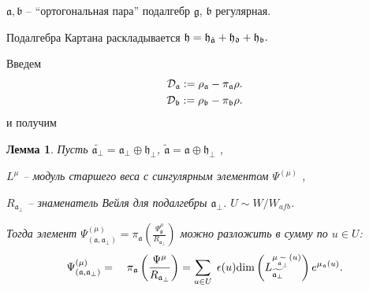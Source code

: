 \documentclass[pdftex]{beamer}
\newtheorem{mylemma}[theorem]{Лемма}
\newcommand{\gf}{\mathfrak{g}}
\newcommand{\af}{\mathfrak{a}}
\newcommand{\afh}{\hat{\mathfrak{a}}}
\newcommand{\bff}{\mathfrak{b}}
\newcommand{\afb}{\mathfrak{a}_{\bot}}
\newcommand{\hf}{\mathfrak{h}}
\theoremstyle{definition} \newtheorem{Def}{Определение}
\begin{document}
\begin{frame}
  
$\af, \mathfrak{b}$ -- ``ортогональная пара'' подалгебр $\gf$, $\bff$ регулярная.

Подалгебра Картана раскладывается
$\frak{{h}=\frak{h}_{\afh}+\frak{h}_{d}+\frak{h}_{\frak{b}}.}$

Введем
\begin{eqnarray*}
\mathcal{D}_{\af} :=\rho_{\af}-\pi_{\af}\rho.\\
\mathcal{D}_{\frak{b}} :=\rho_{\frak{b}}-\pi_{\frak{b}}\rho.
\end{eqnarray*}
и получим
\begin{mylemma}
\label{lemma}
Пусть  $\widetilde{\afb}=\afb\oplus \hf_{\perp }$, $\widetilde{\af}=\af\oplus\hf_{\perp }$ ,

$L^{\mu }$ -- модуль старшего веса с сингулярным элементом $\Psi ^{\left(\mu \right)}$ ,

$R_{\af_{\perp }}$ -- знаменатель Вейля для подалгебры $\af_{\perp }$. $U\sim W/W_{afb}$.

Тогда элемент  $\Psi ^{\left( \mu \right) }_{\left(  \af, \afb \right)}=\pi _{\af}\left( \frac{\Psi _{\gf}^{\mu }}{R_{\af_{\perp }}}\right) $ можно разложить в сумму по  $u\in U$:
\begin{equation*}
\Psi ^{\left( \mu \right) }_{\left(  \af, \afb \right)}=\quad \pi _{\af}\left( \frac{\Psi^{\mu }}{R_{\af%
_{\perp }}}\right) =\sum_{u\in U}\;\epsilon (u)\mathrm{\dim }
\left( L_{\widetilde{\af_{\perp }}}^{\mu _{%
\widetilde{\af_{\perp }}}\left( u\right) }\right) e^{\mu _{\af}\left( u \right) }.
\end{equation*}
\end{mylemma}
\end{frame}
\end{document}
